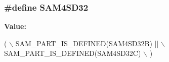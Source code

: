 \hypertarget{group__sam__part__macros__group_gaddfc17b115c4d5b5ff8b14eb2b8d4a2a}{
\subsubsection[{S\-A\-M4\-S\-D32}]{\setlength{\rightskip}{0pt plus 5cm}\#define S\-A\-M4\-S\-D32}}\label{group__sam__part__macros__group_gaddfc17b115c4d5b5ff8b14eb2b8d4a2a}
{\bfseries Value\-:}
\begin{DoxyCode}
( \(\backslash\)
        SAM\_PART\_IS\_DEFINED(SAM4SD32B) || \(\backslash\)
        SAM\_PART\_IS\_DEFINED(SAM4SD32C)    \(\backslash\)
    )
\end{DoxyCode}
